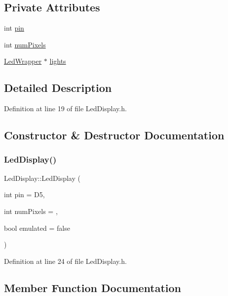 \subsection*{Private Attributes}
\begin{DoxyCompactItemize}
\item 
int \hyperlink{class_led_display_ada84aea1dfd3e348efd492dfdccf596d}{pin}
\item 
int \hyperlink{class_led_display_aef7ced23d44c457c19c3d0f4f88af940}{num\+Pixels}
\item 
\hyperlink{class_led_wrapper}{Led\+Wrapper} $\ast$ \hyperlink{class_led_display_aa3c3d533c862065bd817c016f8fd1cab}{lights}
\end{DoxyCompactItemize}


\subsection{Detailed Description}


Definition at line 19 of file Led\+Display.\+h.



\subsection{Constructor \& Destructor Documentation}
\mbox{\label{class_led_display_a5399399b88b224912bbebbb5e4b36737}} 
\subsubsection{\texorpdfstring{Led\+Display()}{LedDisplay()}}
{\footnotesize\ttfamily Led\+Display\+::\+Led\+Display (\begin{DoxyParamCaption}\item[{int}]{pin = {\ttfamily D5},  }\item[{int}]{num\+Pixels = {},  }\item[{bool}]{emulated = {\ttfamily false} }\end{DoxyParamCaption})\hspace{0.3cm}{\ttfamily [inline]}}



Definition at line 24 of file Led\+Display.\+h.



\subsection{Member Function Documentation}
\mbox{\label{class_led_display_ab2333aa2ee8c8aa328917755249d440b}} 
